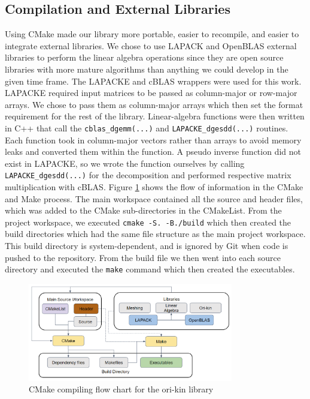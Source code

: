 \subsection{Compilation and External Libraries}
Using CMake made our library more portable, easier to recompile, and easier to integrate external libraries. 
We chose to use LAPACK and OpenBLAS external libraries \cite{anderson1999lapack} to perform the linear algebra operations since they are open source libraries with more mature algorithms than anything we could develop in the given time frame. The LAPACKE and cBLAS wrappers were used for this work. LAPACKE required input matrices to be passed as column-major or row-major arrays. We chose to pass them as column-major arrays which then set the format requirement for the rest of the library. Linear-algebra functions were then written in C++ that call the \texttt{cblas\_dgemm(...)} and \texttt{LAPACKE\_dgesdd(...)} routines. Each function took in column-major vectors rather than arrays to avoid memory leaks and converted them within the function. A pseudo inverse function did not exist in LAPACKE, so we wrote the function ourselves by calling \texttt{LAPACKE\_dgesdd(...)} for the decomposition and performed respective matrix multiplication with cBLAS. Figure \ref{fig:compilation} shows the flow of information in the CMake and Make process. The main workspace contained all the source and header files, which was added to the CMake sub-directories in the CMakeList. From the project workspace, we executed \texttt{cmake -S. -B./build} which then created the build directories which had the same file structure as the main project workspace. This build directory is system-dependent, and is ignored by Git when code is pushed to the repository. From the build file we then went into each source directory and executed the \texttt{make} command which then created the executables.
\begin{figure}[H]
\centering
\includegraphics[width=0.8\textwidth]{Graphics/cmake.PNG}
\caption{CMake compiling flow chart for the ori-kin library}
\label{fig:compilation}
\end{figure}
